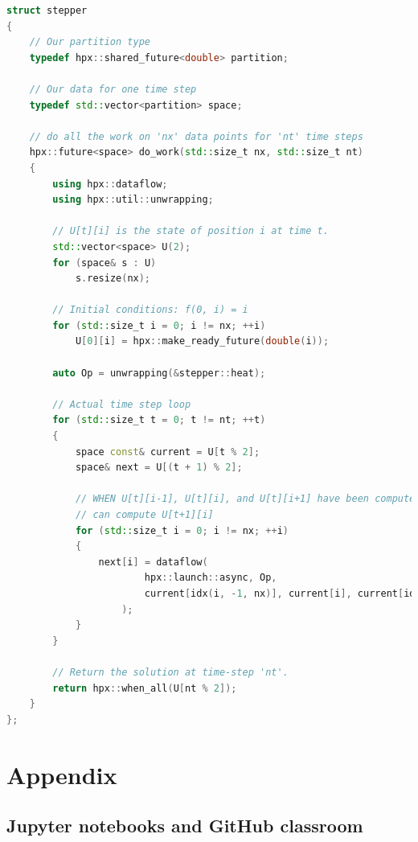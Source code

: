 \documentclass[11pt,fleqn]{book} %
\begin{document}
\begin{lstlisting}[language=c++,caption={Futurized version of the one-dimensional heat equation.\label{code:hpx:future:ready}},float,floatplacement=tb]
struct stepper
{
    // Our partition type
    typedef hpx::shared_future<double> partition;

    // Our data for one time step
    typedef std::vector<partition> space;

    // do all the work on 'nx' data points for 'nt' time steps
    hpx::future<space> do_work(std::size_t nx, std::size_t nt)
    {
        using hpx::dataflow;
        using hpx::util::unwrapping;

        // U[t][i] is the state of position i at time t.
        std::vector<space> U(2);
        for (space& s : U)
            s.resize(nx);

        // Initial conditions: f(0, i) = i
        for (std::size_t i = 0; i != nx; ++i)
            U[0][i] = hpx::make_ready_future(double(i));

        auto Op = unwrapping(&stepper::heat);

        // Actual time step loop
        for (std::size_t t = 0; t != nt; ++t)
        {
            space const& current = U[t % 2];
            space& next = U[(t + 1) % 2];

            // WHEN U[t][i-1], U[t][i], and U[t][i+1] have been computed, THEN we
            // can compute U[t+1][i]
            for (std::size_t i = 0; i != nx; ++i)
            {
                next[i] = dataflow(
                        hpx::launch::async, Op,
                        current[idx(i, -1, nx)], current[i], current[idx(i, +1, nx)]
                    );
            }
        }

        // Return the solution at time-step 'nt'.
        return hpx::when_all(U[nt % 2]);
    }
};
\end{lstlisting}

\newpage
\theendnotes

\part{Appendix}

\chapter*{Jupyter notebooks and GitHub classroom}
\end{document}
